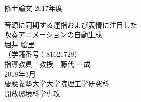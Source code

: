 {\LARGE 修士論文} \hspace{\fill} {\LARGE 2017年度}
\vspace{3cm}
\begin{center}
{\LARGE 音源に同期する運指および表情に注目した\\吹奏アニメーションの自動生成}
\\
\vspace{2cm}
{\Huge 堀井 絵里} \\ \vspace{1.5ex}
{\LARGE （学籍番号：81621728）} \\
\vspace{6.5cm}
{\LARGE 指導教員　教授　藤代 一成} \\
\vspace{2.5cm}
{\Large 2018年3月} \\
\vspace{0.8cm}
{\LARGE 慶應義塾大学大学院理工学研究科} \\ \vspace{1.5ex}
{\LARGE 開放環境科学専攻} \\
\end{center}
